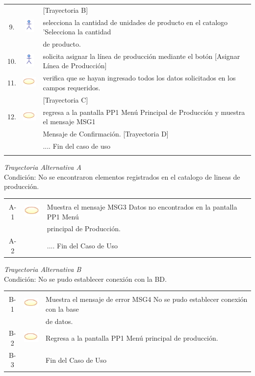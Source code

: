 \documentclass[10pt,spanish]{article}
\providecommand{\tabularnewline}{\\}
\begin{document}
\begin{tabular}{ccl}
	& & [Trayectoria B]\tabularnewline
	9. & \includegraphics{actor} & selecciona la cantidad de unidades de producto en el catalogo 'Selecciona la cantidad\tabularnewline
	& & de producto.\tabularnewline
	10. & \includegraphics{actor} & solicita asignar la línea de producción mediante el botón [Asignar Línea de Producción]\tabularnewline 	
	11. & \includegraphics{sistema} & verifica que se hayan ingresado todos los datos solicitados en los campos requeridos.\tabularnewline
	& & [Trayectoria C]\tabularnewline
	12. & \includegraphics{sistema} & regresa a la pantalla PP1 Menú Principal de Producción y muestra el mensaje MSG1\tabularnewline
	& &  Mensaje de Confirmación. [Trayectoria D]\tabularnewline	 
	 &  & .... Fin del caso de uso\tabularnewline \\
	\end{tabular}			
	
	\textit{Trayectoria Alternativa A}\\
	Condición: No se encontraron elementos registrados en el catalogo de lineas de producción.\\
	\begin{tabular}{ccl}
	& & \tabularnewline
	A-1 & \includegraphics{sistema} & Muestra el mensaje MSG3 Datos no encontrados en la pantalla PP1 Menú  \tabularnewline
	& & principal de Producción.\tabularnewline	
	A-2 & & .... Fin del Caso de Uso\tabularnewline
	\end{tabular}	
	\newpage
	\textit{Trayectoria Alternativa B}\\
	Condición: No se pudo establecer conexión con la BD.\\
	\begin{tabular}{ccl}
	& & \tabularnewline
	B-1 & \includegraphics{sistema} & Muestra el mensaje de error MSG4 No se pudo establecer conexión con la base\tabularnewline
	& & de datos.\tabularnewline
	B-2 & \includegraphics{sistema} & Regresa a la pantalla PP1 Menú principal de producción.\tabularnewline
	B-3 & & Fin del Caso de Uso\tabularnewline	
	\end{tabular}	
\end{document}
